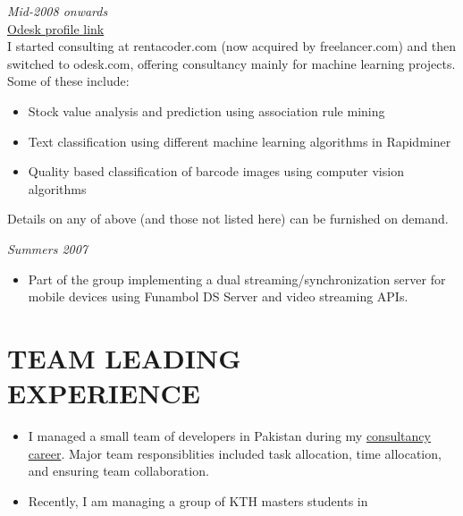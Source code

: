 \documentclass[margin, 10pt]{res} %
\begin{document}
\begin{resume}
{\sl \textbf{}} \hfill \textit{Mid-2008 onwards} \\
{\color{RubineRed}{Odesk Corporation} \hfill \href{https://www.odesk.com/users/~013a228837c241737c}{Odesk profile link}} \\
I started consulting at rentacoder.com (now acquired by freelancer.com) and then switched to odesk.com, offering consultancy mainly for machine learning projects. Some of these include: 

\begin{itemize} \itemsep -2pt %
\item Stock value analysis and prediction using association rule mining
\item Text classification using different machine learning algorithms in Rapidminer 
\item Quality based classification of barcode images using computer vision algorithms
\end{itemize} 
Details on any of above (and those not listed here) can be furnished on demand.

{\sl \textbf{}} \hfill \textit{Summers 2007} \\
{\color{RubineRed}{Five Rivers Technologies, Lahore}}
\begin{itemize}
\item Part of the group implementing a dual streaming/synchronization server for mobile devices using Funambol DS Server and video streaming APIs.
\end{itemize} 

\section{TEAM LEADING \\ EXPERIENCE}
\begin{itemize}
\item I managed a small team of developers in Pakistan during my \href{https://www.odesk.com/users/~013a228837c241737c}{consultancy career}. Major team responsiblities included task allocation, time allocation, and ensuring team collaboration.
\item Recently, I am managing a group of KTH masters students in
\end{itemize}


\end{resume}
\end{document}
